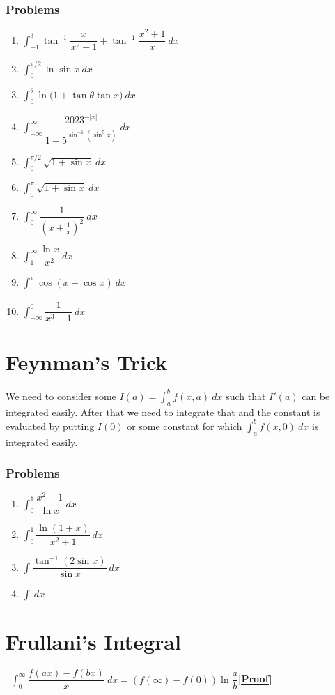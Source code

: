 \documentclass[12pt,a4paper,twoside]{book}
\newcommand{\dint}[1]{\displaystyle{\int #1 \  dx}}
\begin{document}
\subsubsection{Problems}
	\begin{multicols}{2}
	\begin{enumerate}
	\item $\dint{_{-1}^3 \tan^{-1}{\dfrac{x}{x^2+1}}+ \tan^{-1}{\dfrac{x^2+1}{x}}}$
	\item $\dint{_0^{\pi/2}\ln \sin x}$
	\item $\dint{_0^\theta \ln{(1+\tan\theta \tan x})}$
	\item $\dint{_{-\infty}^\infty \dfrac{2023^{-|x|}}{1+5^{\sin^{-1}{(\sin^5x)}}}}$
	\item $\dint{_0^{\pi/2}\sqrt{1+\sin x}}$
	\item $\dint{_0^{\pi}\sqrt{1+\sin x}}$
	\item $\dint{_0^\infty \dfrac{1}{(x+\frac{1}{x})^2}}$
	\item $\dint{_1^\infty \dfrac{\ln x}{x^2}}$
	\item $\dint{_0^\pi \cos{(x+\cos x)}}$
	\item $\dint{_{-\infty}^0 \dfrac{1}{x^3-1}}$
	\end{enumerate}
	\end{multicols}
\section{Feynman's Trick}
We need to consider some $I(a)=\dint{_a^bf(x,a)}$ such that $I'(a)$ can be integrated easily. After that we need to integrate that and the constant is evaluated by putting $I(0)$ or some constant for which $\dint{_a^bf(x,0)}$ is integrated easily.
	\subsubsection{Problems}
	\begin{multicols}{2}
	\begin{enumerate}
	\item $\dint{_0^1\dfrac{x^2-1}{\ln x}}$
	\item $\dint{_0^1\dfrac{\ln{(1+x)}}{x^2+1}}$
	\item $\dint{\dfrac{\tan^{-1}{(2\sin x)}}{\sin x}}$
	\item $\dint{}$
	\end{enumerate}
	\end{multicols}

\section{Frullani's Integral}
\begin{tcolorbox}[halign=center]
\ \hfill$\dint{_0^{\infty} \dfrac{f(ax)-f(bx)}{x}}=(f(\infty)-f(0))\ln{\dfrac{a}{b}}$\hfill \href{https://en.wikipedia.org/wiki/Frullani_integral}{\textbf{[Proof]}}
\end{tcolorbox}
\end{document}
